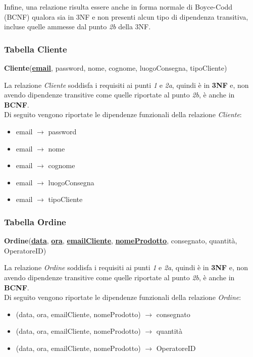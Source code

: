 \documentclass[12pt,a4paper]{article}
\begin{document}
    \vspace{5pt}
    \noindent
    Infine, una relazione risulta essere anche in forma normale di Boyce-Codd (BCNF) qualora sia in 3NF e non presenti alcun tipo di dipendenza transitiva, incluse quelle ammesse dal punto \textit{2b} della 3NF.

    \subsubsection*{Tabella Cliente}
    \begin{tcolorbox}[
        colback=gray!8,
        colframe=black!30,
        title=
    ]
        \textbf{Cliente}(\textbf{\uline{email}}, password, nome, cognome, luogoConsegna, tipoCliente)
    \end{tcolorbox}

    \noindent
    La relazione \textit{Cliente} soddisfa i requisiti ai punti \textit{1} e \textit{2a}, quindi è in \textbf{3NF} e, non avendo dipendenze transitive come quelle riportate al punto \textit{2b}, è anche in \textbf{BCNF}.\\
    Di seguito vengono riportate le dipendenze funzionali della relazione \textit{Cliente}:
    \begin{itemize}[leftmargin=1em, label=$\circ$]
        \item email $\rightarrow$ password
        \item email $\rightarrow$ nome
        \item email $\rightarrow$ cognome
        \item email $\rightarrow$ luogoConsegna
        \item email $\rightarrow$ tipoCliente
    \end{itemize}
    
    \subsubsection*{Tabella Ordine}
    \begin{tcolorbox}[
        colback=gray!8,
        colframe=black!30,
        title=
    ]
        \textbf{Ordine}(\uline{\textbf{data}}, \textbf{\uline{ora}}, \textbf{\uline{emailCliente}}, \textbf{\uline{nomeProdotto}}, consegnato, quantità, OperatoreID)
    \end{tcolorbox}
    
    \noindent
    La relazione \textit{Ordine} soddisfa i requisiti ai punti \textit{1} e \textit{2a}, quindi è in \textbf{3NF} e, non avendo dipendenze transitive come quelle riportate al punto \textit{2b}, è anche in \textbf{BCNF}.\\
    Di seguito vengono riportate le dipendenze funzionali della relazione \textit{Ordine}:
    \begin{itemize}[leftmargin=1em, label=$\circ$]
        \item (data, ora, emailCliente, nomeProdotto) $\rightarrow$ consegnato
        \item (data, ora, emailCliente, nomeProdotto) $\rightarrow$ quantità
        \item (data, ora, emailCliente, nomeProdotto) $\rightarrow$ OperatoreID
    
    \end{itemize}
\end{document}
